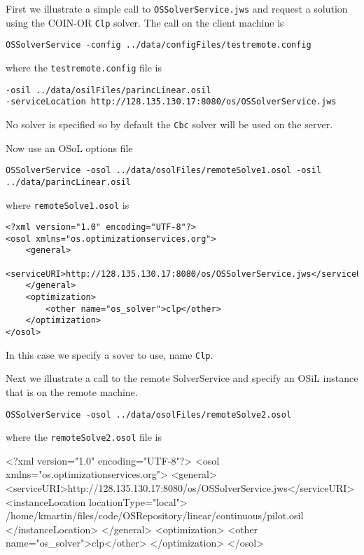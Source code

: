 \documentclass[11pt]{article}
\renewcommand{\_}{{\char"5F}}
\renewcommand{\{}{{\char"7B}}
\renewcommand{\}}{{\char"7D}}
\renewcommand{\^}{{\char"0D}}
\renewcommand{\'}{{\char"0D}}
\begin{document}
First we illustrate a simple call to   {\tt OSSolverService.jws} and request a solution using the COIN-OR  {\tt Clp} solver.  The call on the client machine is

\begin{verbatim}
OSSolverService -config ../data/configFiles/testremote.config
\end{verbatim}
where the {\tt testremote.config} file is
\begin{verbatim}
-osil ../data/osilFiles/parincLinear.osil
-serviceLocation http://128.135.130.17:8080/os/OSSolverService.jws
\end{verbatim}

No solver is specified so by default the  {\tt Cbc} solver will be used on the server.  

Now use an OSoL options file
\begin{verbatim}
OSSolverService -osol ../data/osolFiles/remoteSolve1.osol -osil ../data/parincLinear.osil
\end{verbatim}
where {\tt remoteSolve1.osol} is
\begin{verbatim}
<?xml version="1.0" encoding="UTF-8"?>
<osol xmlns="os.optimizationservices.org">
    <general>
        <serviceURI>http://128.135.130.17:8080/os/OSSolverService.jws</serviceURI>
    </general>
    <optimization>
    	<other name="os_solver">clp</other>
    </optimization>
</osol>
\end{verbatim}
In this case we specify a sover to use, name {\tt Clp}.

Next we illustrate a call to the remote SolverService and specify an OSiL instance that is on the remote machine.
\begin{verbatim}
OSSolverService -osol ../data/osolFiles/remoteSolve2.osol
\end{verbatim}
where the {\tt remoteSolve2.osol} file is
\begin{verbatimtab}[4]
<?xml version="1.0" encoding="UTF-8"?>
<osol xmlns="os.optimizationservices.org">
    <general>
        <serviceURI>http://128.135.130.17:8080/os/OSSolverService.jws</serviceURI>
         <instanceLocation locationType="local">
	 /home/kmartin/files/code/OSRepository/linear/continuous/pilot.osil
	 </instanceLocation>
    </general>
    <optimization>
    	<other name="os_solver">clp</other>
    </optimization>
</osol>
\end{verbatimtab}
\end{document}
